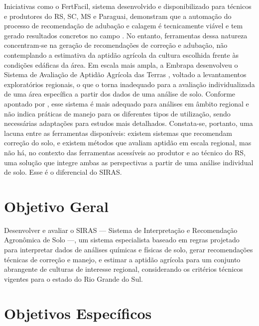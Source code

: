 Iniciativas como o FertFacil, sistema desenvolvido e disponibilizado para
técnicos e produtores do RS, SC, MS e Paraguai, demonstram que a automação do
processo de recomendação de adubação e calagem é tecnicamente viável e tem gerado
resultados concretos no campo \citep{Tiecher2016}. No entanto, ferramentas dessa
natureza concentram-se na geração de recomendações de correção e adubação, não
contemplando a estimativa da aptidão agrícola da cultura escolhida frente às
condições edáficas da área. Em escala mais ampla, a Embrapa desenvolveu o Sistema
de Avaliação de Aptidão Agrícola das Terras \citep{EmbrapaAptidao2025}, voltado
a levantamentos exploratórios regionais, o que o torna inadequado para a avaliação
individualizada de uma área específica a partir dos dados de uma análise de solo.
Conforme apontado por \cite{Hofig2015}, esse sistema é mais adequado para
análises em âmbito regional e não indica práticas de manejo para os diferentes
tipos de utilização, sendo necessárias adaptações para estudos mais detalhados.
Constata-se, portanto, uma lacuna entre as ferramentas disponíveis: existem
sistemas que recomendam correção do solo, e existem métodos que avaliam aptidão
em escala regional, mas não há, no contexto das ferramentas acessíveis ao produtor
e ao técnico do RS, uma solução que integre ambas as perspectivas a partir de uma
análise individual de solo. Esse é o diferencial do SIRAS.

\section{Objetivo Geral}\label{sec:obj_geral}

Desenvolver e avaliar o SIRAS --- Sistema de Interpretação e Recomendação
Agronômica de Solo ---, um sistema especialista baseado em regras projetado
para interpretar dados de análises químicas e físicas de solo, gerar
recomendações técnicas de correção e manejo, e estimar a aptidão agrícola
para um conjunto abrangente de culturas de interesse regional, considerando
os critérios técnicos vigentes para o estado do Rio Grande do Sul.

\section{Objetivos Específicos}\label{sec:obj_espec}

